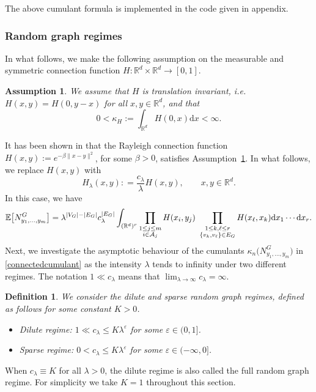 \documentclass[12pt]{article}
\newtheorem{assumption}{Assumption}[section]
\newcommand{\R}{\mathbb{R}}
\newcommand{\E}{\mathbb{E}}
\newtheorem{definition}[prop]{Definition}
\def\real{{\mathord{\mathbb R}}}
\numberwithin{equation}{section}
\begin{document}
\medskip

\noindent
 The above cumulant formula is implemented in the code given in appendix. 

\subsubsection*{Random graph regimes} %
\label{khopcount}
\noindent
In what follows,
we make the following assumption on the measurable and symmetric 
connection function $H:\R^d\times\R^d\to[0,1]$. 
 \begin{assumption}
  \label{fjkldsf} 
 We assume that $H$ is translation invariant, i.e. $H(x,y)=H(0,y-x)$ for all $x,y\in\R^d$, and that 
\begin{equation}
  \label{integrability-1}
0<\kappa_H:=\int_{\R^d}H(0,x)\mathrm{d}x<\infty.
\end{equation}
\end{assumption}
It has been shown in \cite{LiuPrivault} that the Rayleigh connection function $H(x,y):=e^{-\beta\|x-y\|^2}$, for some $\beta>0$, satisfies Assumption~\ref{fjkldsf}. 
 In what follows, we replace $H(x,y)$ with
$$
H_\lambda (x,y) : = \frac{c_\lambda}{\lambda} H(x,y),
\qquad x, y \in \real^d. 
$$
 In this case, we have 
$$
 \E\big[ N_{y_1,\ldots , y_m}^G \big]
 =  \lambda^{|V_G|-|E_G|} c_\lambda^{|E_G|}
     \int_{(\R^d)^r}
       \prod_{\substack{1 \leq j \leq m
      \\
    i\in {\cal A}_j}}  H(x_i,y_j)
  \ \prod_{\substack{
      1\leq k , \ell \le r 
      \\
  \{ v_k , v_\ell \}\in E_G}}H(x_\ell,x_k)\mathrm{d}x_1\cdots\mathrm{d}x_r.
$$ 
Next, we investigate the asymptotic behaviour of the cumulants
$\kappa_n\big(N_{y_1,\ldots , y_m}^G\big)$ in \eqref{connectedcumulant} as the intensity $\lambda$ tends to infinity under two different regimes. 
The notation $\displaystyle 1 \ll c_\lambda$ means that
 $\lim_{\lambda \to \infty} c_\lambda = \infty$. 
\begin{definition}
  We consider the dilute and sparse random graph regimes, defined as follows for some constant $K>0$.  
\begin{itemize}
\item Dilute regime:
  $\displaystyle 1 \ll c_\lambda\leq K \lambda^\varepsilon$ %
  for some $\varepsilon \in (0,1]$. 
  \item Sparse regime: $\displaystyle 0 < c_\lambda\leq K \lambda^\varepsilon$
    for some $\varepsilon \in (-\infty , 0]$. 
\end{itemize}
\end{definition}
 When $c_\lambda\equiv K$ for all $\lambda>0$, the dilute regime is also called the full random graph regime. For simplicity we take $K=1$ throughout this section. 
\end{document}
